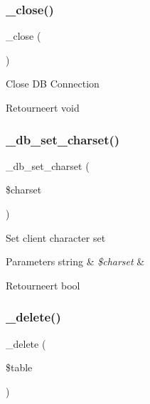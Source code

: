 \subsubsection{\texorpdfstring{\_close()}{\_close()}}
{\footnotesize\ttfamily \+\_\+close (\begin{DoxyParamCaption}{ }\end{DoxyParamCaption})\hspace{0.3cm}{\ttfamily [protected]}}

Close DB Connection

\begin{DoxyReturn}{Retourneert}
void 
\end{DoxyReturn}
\mbox{\label{class_c_i___d_b__postgre__driver_a2b808d420d8e9fea0b73ad7127f5efb8}} 
\subsubsection{\texorpdfstring{\_db\_set\_charset()}{\_db\_set\_charset()}}
{\footnotesize\ttfamily \+\_\+db\+\_\+set\+\_\+charset (\begin{DoxyParamCaption}\item[{}]{\$charset }\end{DoxyParamCaption})\hspace{0.3cm}{\ttfamily [protected]}}

Set client character set


\begin{DoxyParams}[1]{Parameters}
string & {\em \$charset} & \\
\hline
\end{DoxyParams}
\begin{DoxyReturn}{Retourneert}
bool 
\end{DoxyReturn}
\mbox{\label{class_c_i___d_b__postgre__driver_a133ea8446ded52589bd22cc9163d0896}} 
\subsubsection{\texorpdfstring{\_delete()}{\_delete()}}
{\footnotesize\ttfamily \+\_\+delete (\begin{DoxyParamCaption}\item[{}]{\$table }\end{DoxyParamCaption})\hspace{0.3cm}{\ttfamily [protected]}}


